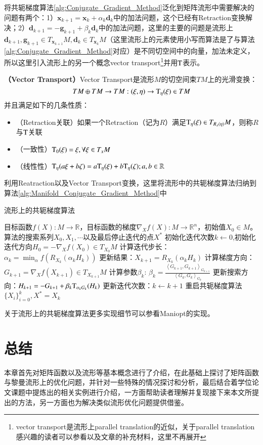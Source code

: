 将共轭梯度算法\ref{alg:Conjugate_Gradient_Method}泛化到矩阵流形中需要解决的问题有两个：1）$\bm{x}_{k+1}=\bm{x}_{k}+\alpha_{k}\bm{d}_k$中的加法问题，这个已经有Retraction变换解决；2）$\bm{d}_{k+1}=-\bm{g}_{k+1}+\beta_{k}\bm{d}_{k}$中的加法问题，这里的主要的问题是流形上$\bm{d}_{k+1},\bm{g}_{k+1} \in T_{\bm{x}_{k+1}}M,\bm{d}_{k} \in T_{\bm{x}_{k}}M$（这里流形上的元素使用小写而算法是了与算法\ref{alg:Conjugate_Gradient_Method}对应）是不同切空间中的向量，加法未定义，所以这里引入流形上的另一个概念vector transport\footnote{vector transport是流形上parallel translation的近似，关于parallel translation感兴趣的读者可以参看\cite{Maniopt_book,Maniopt_DiscreteCurveFitting}以及文章\cite{RCCA}的补充材料，这里不再展开}并用${\rm T}$表示。
\begin{definition}
\label{Vector_Transport}
\textbf{（Vector Transport）}Vector Transport是流形$M$的切空间束$TM$上的光滑变换：
\begin{displaymath}
TM\oplus TM \rightarrow TM:(\xi,\eta)\rightarrow {\rm T}_{\eta}(\xi) \in TM
\end{displaymath}
并且满足如下的几条性质：
\begin{itemize}
\label{Vector_Transport_Properties}
\item （Retraction关联）如果一个Retraction（记为$R$）满足${\rm T}_{\eta}(\xi)\in T_{R_{x}(\eta)}M$，则称$R$与${\rm T}$关联
\item （一致性）${\rm T}_{0}(\xi)=\xi,\forall \xi \in T_{x}M$
\item （线性性）${\rm T}_{\eta}(a\xi+b\zeta)=a{\rm T}_{\eta}(\xi)+b{\rm T}_{\eta}(\zeta);a,b \in \mathbb{R}$
\end{itemize}
\end{definition}
利用Reatraction以及Vector Transport变换，这里将流形中的共轭梯度算法归纳到算法\ref{alg:Manifold_Conjugate_Gradient_Method}中
\begin{algorithm}[t]
\caption{流形上的共轭梯度算法}
\label{alg:Manifold_Conjugate_Gradient_Method}
\begin{algorithmic}[1]
\REQUIRE 目标函数$f(X):M \rightarrow \mathbb{R}$，目标函数的梯度$\nabla_X f(X):M \rightarrow \mathbb{R}^{n}$，初始值$X_0 \in M$。
\ENSURE 算法的搜索系列$X_0,X_1,\cdots$以及最后停止迭代的点$X^{*}$
\STATE 初始化迭代次数$k \leftarrow 0$,初始化迭代方向$H_{0}=-\nabla_X f(X_0)\in T_{X_0}M$
\STATE 计算迭代步长：$\alpha_{k}=\min_{\alpha}f(R_{X_{k}}(\alpha_{k}H_{k}))$
\STATE 更新结果：$X_{k+1}=R_{X_{k}}(\alpha_{k}H_{k})$
\STATE 计算梯度方向：$G_{k+1}=\nabla_{X}f(X_{k+1}) \in T_{X_{k+1}}M$
\STATE 计算参数$\beta_{k}$: $\beta_{k}=\frac{\left<G_{k+1},G_{k+1}\right>_{G_{k+1}}}{\left<G_{k},G_{k}\right>_{G_{k}}}$
\STATE 更新搜索方向：$H_{k+1}=-G_{k+1}+\beta_{k}{\rm T}_{\alpha_{k}G_{k}}(H_{k})$
\STATE 更新迭代次数：$k\leftarrow k+1$
\STATE 重启共轭梯度算法
\ENDIF
\ENDWHILE
\RETURN $\{X_i\}_{i=0}^{k},X^{*}=X_{k}$
\end{algorithmic}
\end{algorithm}
关于流形上的共轭梯度算法更多实现细节可以参看Maniopt\cite{Maniopt_tool}的实现。
\section{总结}
\label{opt_conclusion}
本章首先对矩阵函数以及流形等基本概念进行了介绍，在此基础上探讨了矩阵函数与黎曼流形上的优化问题，并针对一些特殊的情况探讨和分析，最后结合着学位论文课题中提炼出的相关实例进行介绍，一方面帮助读者理解并复现接下来本文所提出的方法，另一方面也为解决类似流形优化问题提供借鉴。